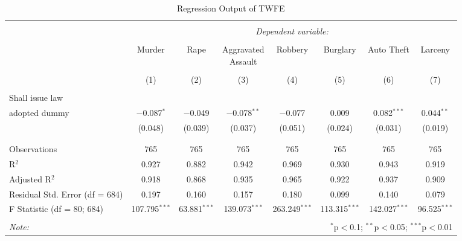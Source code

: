 
\begin{table}[!htbp] \centering 
    \caption{Regression Output of TWFE} 
    \label{tab:regression} 
    \resizebox{1.0\textwidth}{!} {
  \begin{tabular}{@{\extracolsep{\fill}}lccccccc} 
  \\[-1.8ex]\hline 
  \hline \\[-1.8ex] 
   & \multicolumn{7}{c}{\textit{Dependent variable:}} \\ 
  \cline{2-8} 
  \\[-1.8ex] & Murder & Rape & \shortstack{Aggravated \\ Assault} & Robbery & Burglary & Auto Theft & Larceny \\ 
  \\[-1.8ex] & (1) & (2) & (3) & (4) & (5) & (6) & (7)\\ 
  \hline \\[-1.8ex] 
   Shall issue law \\ adopted dummy & $-$0.087$^{*}$ & $-$0.049 & $-$0.078$^{**}$ & $-$0.077 & 0.009 & 0.082$^{***}$ & 0.044$^{**}$ \\ 
    & (0.048) & (0.039) & (0.037) & (0.051) & (0.024) & (0.031) & (0.019) \\ 
    & & & & & & & \\ 
  \hline \\[-1.8ex] 
  Observations & 765 & 765 & 765 & 765 & 765 & 765 & 765 \\ 
  R$^{2}$ & 0.927 & 0.882 & 0.942 & 0.969 & 0.930 & 0.943 & 0.919 \\ 
  Adjusted R$^{2}$ & 0.918 & 0.868 & 0.935 & 0.965 & 0.922 & 0.937 & 0.909 \\ 
  Residual Std. Error (df = 684) & 0.197 & 0.160 & 0.157 & 0.180 & 0.099 & 0.140 & 0.079 \\ 
  F Statistic (df = 80; 684) & 107.795$^{***}$ & 63.881$^{***}$ & 139.073$^{***}$ & 263.249$^{***}$ & 113.315$^{***}$ & 142.027$^{***}$ & 96.525$^{***}$ \\ 
  \hline 
  \hline \\[-1.8ex] 
  \textit{Note:}  & \multicolumn{7}{r}{$^{*}$p$<$0.1; $^{**}$p$<$0.05; $^{***}$p$<$0.01} \\ 
  \end{tabular} 
  }
  \end{table} 
  